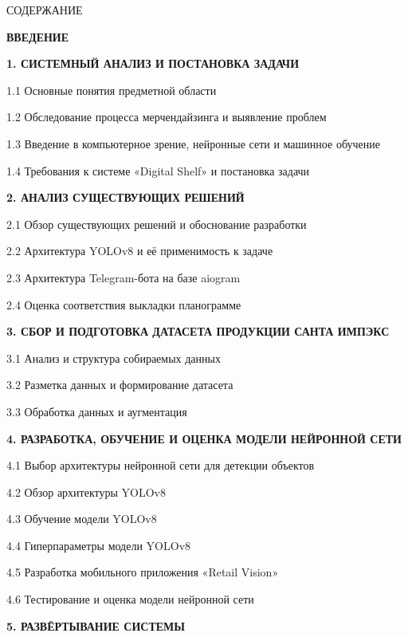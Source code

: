 {\gostTitleFont
    \redline
    СОДЕРЖАНИЕ
} 

\titlespace

{\gostFont

    \par {\bfseries ВВЕДЕНИЕ }
    \par {\bfseries 1. СИСТЕМНЫЙ АНАЛИЗ И ПОСТАНОВКА ЗАДАЧИ }
    \par 1.1 Основные понятия предметной области 
    \par 1.2 Обследование процесса мерчендайзинга и выявление проблем 
    \par 1.3 Введение в компьютерное зрение, нейронные сети и машинное обучение 
    \par 1.4 Требования к системе «Digital Shelf» и постановка задачи 
    \par {\bfseries 2. АНАЛИЗ СУЩЕСТВУЮЩИХ РЕШЕНИЙ }
    \par 2.1 Обзор существующих решений и обоснование разработки 
    \par 2.2 Архитектура YOLOv8 и её применимость к задаче 
    \par 2.3 Архитектура Telegram-бота на базе aiogram 
    \par 2.4 Оценка соответствия выкладки планограмме 
    \par {\bfseries 3. СБОР И ПОДГОТОВКА ДАТАСЕТА ПРОДУКЦИИ САНТА ИМПЭКС }
    \par 3.1 Анализ и структура собираемых данных 
    \par 3.2 Разметка данных и формирование датасета 
    \par 3.3 Обработка данных и аугментация 
    \par {\bfseries 4. РАЗРАБОТКА, ОБУЧЕНИЕ И ОЦЕНКА МОДЕЛИ НЕЙРОННОЙ СЕТИ }
    \par 4.1 Выбор архитектуры нейронной сети для детекции объектов 
    \par 4.2 Обзор архитектуры YOLOv8 
    \par 4.3 Обучение модели YOLOv8 
    \par 4.4 Гиперпараметры модели YOLOv8 
    \par 4.5 Разработка мобильного приложения «Retail Vision» 
    \par 4.6 Тестирование и оценка модели нейронной сети 
    \par {\bfseries 5. РАЗВЁРТЫВАНИЕ СИСТЕМЫ }
}
